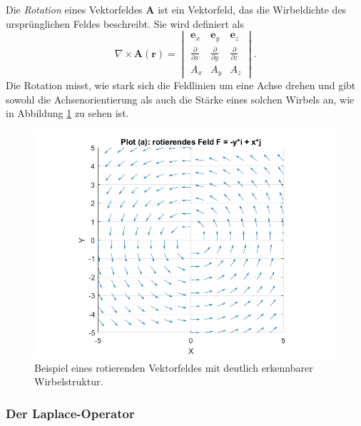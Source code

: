 Die \emph{Rotation} eines Vektorfeldes $\boldsymbol{A}$ ist ein Vektorfeld,
%
das die Wirbeldichte des ursprünglichen Feldes beschreibt.
Sie wird definiert als
\begin{equation}
\nabla \times \boldsymbol{A}(\boldsymbol{r})
=
\begin{vmatrix}
    \boldsymbol{e}_x & \boldsymbol{e}_y & \boldsymbol{e}_z \\[2pt]
    \displaystyle\frac{\partial}{\partial x} & \displaystyle\frac{\partial}{\partial y} & \displaystyle\frac{\partial}{\partial z}\\[4pt]
    A_x & A_y & A_z
\end{vmatrix}.
\end{equation}
Die Rotation misst, wie stark sich die Feldlinien um eine Achse
drehen und gibt sowohl die Achsenorientierung als auch die Stärke
eines solchen Wirbels an, wie in Abbildung \ref{fig:RotationAlg}
zu sehen ist.

\begin{figure}
    \centering
    \includegraphics[scale=0.4]{papers/helmholtz/images/rotierendes_Feld.png}
    \caption{Beispiel eines rotierenden Vektorfeldes mit deutlich erkennbarer Wirbelstruktur.}
    \label{fig:RotationAlg}
\end{figure}

\subsubsection{Der Laplace-Operator}

